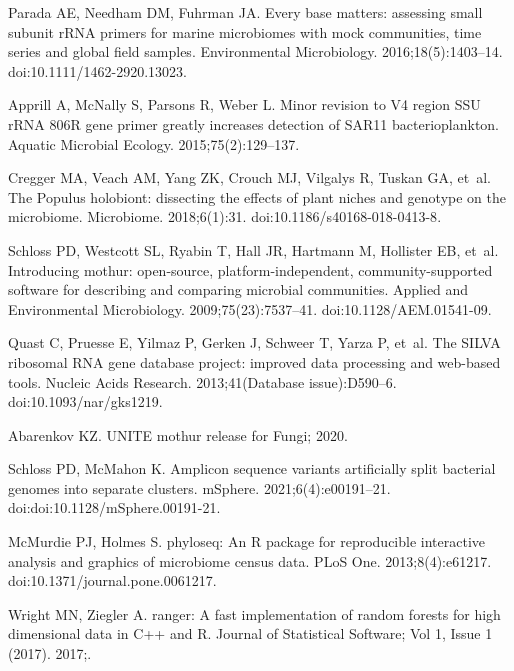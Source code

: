 \documentclass[
  10pt,
  letterpaper,
]{article}
\begin{document}
\begin{thebibliography}{10}
  Parada AE, Needham DM, Fuhrman JA.
  \newblock Every base matters: assessing small subunit {rRNA} primers for marine
    microbiomes with mock communities, time series and global field samples.
  \newblock Environmental Microbiology. 2016;18(5):1403--14.
  \newblock doi:{10.1111/1462-2920.13023}.
  
  Apprill A, McNally S, Parsons R, Weber L.
  \newblock Minor revision to {V4} region {SSU} {rRNA} {806R} gene primer greatly
    increases detection of {SAR11} bacterioplankton.
  \newblock Aquatic Microbial Ecology. 2015;75(2):129--137.
  
  Cregger MA, Veach AM, Yang ZK, Crouch MJ, Vilgalys R, Tuskan GA, et~al.
  \newblock The {Populus} holobiont: dissecting the effects of plant niches and
    genotype on the microbiome.
  \newblock Microbiome. 2018;6(1):31.
  \newblock doi:{10.1186/s40168-018-0413-8}.
  
  Schloss PD, Westcott SL, Ryabin T, Hall JR, Hartmann M, Hollister EB, et~al.
  \newblock Introducing mothur: open-source, platform-independent,
    community-supported software for describing and comparing microbial
    communities.
  \newblock Applied and Environmental Microbiology. 2009;75(23):7537--41.
  \newblock doi:{10.1128/AEM.01541-09}.
  
  Quast C, Pruesse E, Yilmaz P, Gerken J, Schweer T, Yarza P, et~al.
  \newblock The {SILVA} ribosomal {RNA} gene database project: improved data
    processing and web-based tools.
  \newblock Nucleic Acids Research. 2013;41(Database issue):D590--6.
  \newblock doi:{10.1093/nar/gks1219}.
  
  Abarenkov KZ. {UNITE} mothur release for {Fungi}; 2020.
  
  Schloss PD, McMahon K.
  \newblock Amplicon sequence variants artificially split bacterial genomes into
    separate clusters.
  \newblock mSphere. 2021;6(4):e00191--21.
  \newblock doi:{doi:10.1128/mSphere.00191-21}.
  
  McMurdie PJ, Holmes S.
  \newblock phyloseq: {An} {R} package for reproducible interactive analysis and
    graphics of microbiome census data.
  \newblock PLoS One. 2013;8(4):e61217.
  \newblock doi:{10.1371/journal.pone.0061217}.
  
  Wright MN, Ziegler A.
  \newblock ranger: {A} fast implementation of random forests for high
    dimensional data in {C}++ and {R}.
  \newblock Journal of Statistical Software; Vol 1, Issue 1 (2017). 2017;.
  

\end{thebibliography}
\end{document}
